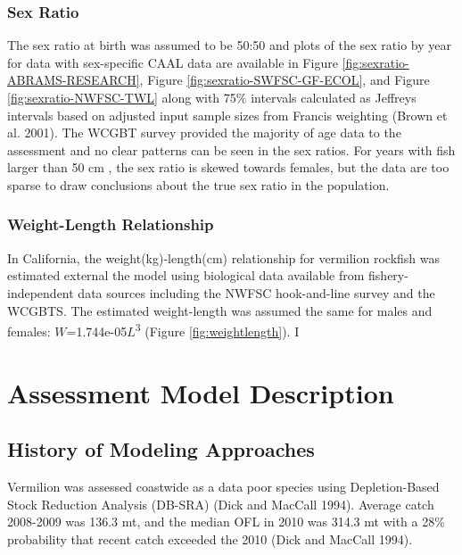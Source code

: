 \documentclass[
  english,
  a4paper,
]{article}
\begin{document}
\hypertarget{sex-ratio}{%
\subsubsection{Sex Ratio}\label{sex-ratio}}

The sex ratio at birth was assumed to be 50:50 and plots of the sex ratio by year for data with sex-specific CAAL data are available in Figure \ref{fig:sexratio-ABRAMS-RESEARCH}, Figure \ref{fig:sexratio-SWFSC-GF-ECOL}, and
Figure \ref{fig:sexratio-NWFSC-TWL} along with 75\% intervals calculated as Jeffreys intervals based on adjusted input sample sizes from Francis weighting (Brown et al. 2001). The WCGBT survey provided the majority of age data to the assessment and no clear patterns can be seen in the sex ratios. For years with fish larger than 50 cm , the sex ratio is skewed towards females, but the data are too sparse to draw conclusions about the true sex ratio in the population.

\hypertarget{weight-length-relationship}{%
\subsubsection{Weight-Length Relationship}\label{weight-length-relationship}}

In California, the weight(kg)-length(cm) relationship for vermilion rockfish was estimated external the
model using biological data available from fishery-independent
data sources including the NWFSC hook-and-line survey and the WCGBTS. The estimated
weight-length was assumed the same for males and females:
\(W\)=1.744e-05\(L\)\textsuperscript{3}
(Figure \ref{fig:weightlength}).
I

\hypertarget{assessment-model-description}{%
\section{Assessment Model Description}\label{assessment-model-description}}

\hypertarget{history-of-modeling-approaches}{%
\subsection{History of Modeling Approaches}\label{history-of-modeling-approaches}}

Vermilion was assessed coastwide as a data poor species using
Depletion-Based Stock Reduction Analysis (DB-SRA) (Dick and MacCall 1994). Average catch
2008-2009 was 136.3 mt, and the median OFL in 2010 was 314.3 mt with a 28\%
probability that recent catch exceeded the 2010 (Dick and MacCall 1994).
\end{document}
